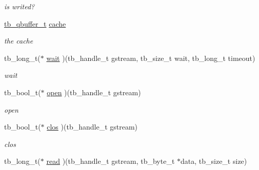 \begin{DoxyCompactItemize}
\begin{DoxyCompactList}\small\item\em is writed? \end{DoxyCompactList}\item 
\hypertarget{structtb__gstream__t_a280a4b966806c5afbcdf0ffdc60bd72f}{\hyperlink{structtb__qbuffer__t}{tb\-\_\-qbuffer\-\_\-t} \hyperlink{structtb__gstream__t_a280a4b966806c5afbcdf0ffdc60bd72f}{cache}}\label{structtb__gstream__t_a280a4b966806c5afbcdf0ffdc60bd72f}

\begin{DoxyCompactList}\small\item\em the cache \end{DoxyCompactList}\item 
\hypertarget{structtb__gstream__t_afce31a60298053fa4bcb288e7005c7cb}{tb\-\_\-long\-\_\-t($\ast$ \hyperlink{structtb__gstream__t_afce31a60298053fa4bcb288e7005c7cb}{wait} )(tb\-\_\-handle\-\_\-t gstream, tb\-\_\-size\-\_\-t wait, tb\-\_\-long\-\_\-t timeout)}\label{structtb__gstream__t_afce31a60298053fa4bcb288e7005c7cb}

\begin{DoxyCompactList}\small\item\em wait \end{DoxyCompactList}\item 
\hypertarget{structtb__gstream__t_a8b54b77908098ef570f280a56bb83b05}{tb\-\_\-bool\-\_\-t($\ast$ \hyperlink{structtb__gstream__t_a8b54b77908098ef570f280a56bb83b05}{open} )(tb\-\_\-handle\-\_\-t gstream)}\label{structtb__gstream__t_a8b54b77908098ef570f280a56bb83b05}

\begin{DoxyCompactList}\small\item\em open \end{DoxyCompactList}\item 
\hypertarget{structtb__gstream__t_ac698caf6e73f6521c8fafa7e97e78ec3}{tb\-\_\-bool\-\_\-t($\ast$ \hyperlink{structtb__gstream__t_ac698caf6e73f6521c8fafa7e97e78ec3}{clos} )(tb\-\_\-handle\-\_\-t gstream)}\label{structtb__gstream__t_ac698caf6e73f6521c8fafa7e97e78ec3}

\begin{DoxyCompactList}\small\item\em clos \end{DoxyCompactList}\item 
\hypertarget{structtb__gstream__t_afaacadc9245ed3b3ff391b73a15e7966}{tb\-\_\-long\-\_\-t($\ast$ \hyperlink{structtb__gstream__t_afaacadc9245ed3b3ff391b73a15e7966}{read} )(tb\-\_\-handle\-\_\-t gstream, tb\-\_\-byte\-\_\-t $\ast$data, tb\-\_\-size\-\_\-t size)}\label{structtb__gstream__t_afaacadc9245ed3b3ff391b73a15e7966}


\end{DoxyCompactItemize}
